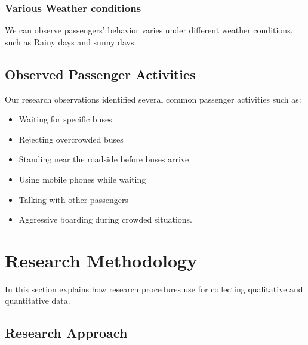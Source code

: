 \documentclass[12pt,a4paper]{report}
\begin{document}


\subsection{Various Weather conditions}
We can observe passengers’ behavior varies under different weather conditions, such as Rainy days and sunny days. 

\section{Observed Passenger Activities}

Our research observations identified several common passenger activities such as:

\begin{itemize}[noitemsep]

\item Waiting for specific buses

\item Rejecting overcrowded buses

\item Standing near the roadside before buses arrive

\item Using mobile phones while waiting

\item Talking with other passengers

\item Aggressive boarding during crowded situations.

\end{itemize}



\chapter{Research Methodology}

In this section explains how research procedures use for collecting qualitative and quantitative data.


\section{Research Approach}
\end{document}
